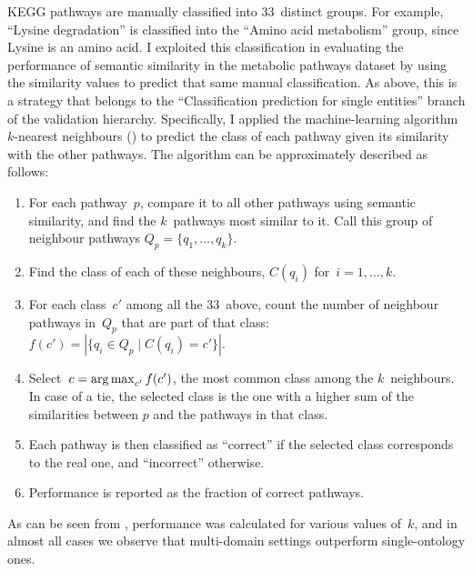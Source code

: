 KEGG pathways are manually classified into $33$~distinct groups. For example, ``Lysine degradation'' is classified into the ``Amino acid metabolism'' group, since Lysine is an amino acid. I exploited this classification in evaluating the performance of semantic similarity in the metabolic pathways dataset by using the similarity values to predict that same manual classification. As above, this is a strategy that belongs to the ``Classification prediction for single entities'' branch of the validation hierarchy. Specifically, I applied the machine-learning algorithm $k$-nearest neighbours (\knn) to predict the class of each pathway given its similarity with the other pathways. The algorithm can be approximately described as follows:
\begin{enumerate}
    \item For each pathway~$p$, compare it to all other pathways using semantic similarity, and find the $k$~pathways most similar to it. Call this group of neighbour pathways $Q_p = \{q_1, \dots, q_k\}$.
    \item Find the class of each of these neighbours, $C(q_i)$ for~$i=1,\ldots, k$.
    \item For each class~$c'$ among all the $33$~above, count the number of neighbour pathways in~$Q_p$ that are part of that class: $f(c') = |\{q_i \in Q_p \mid C(q_i) = c'\}|$.
    \item Select~$c = \operatorname*{arg\,max}_{c'}f(c')$, \ie the most common class among the $k$~neighbours. In case of a tie, the selected class is the one with a higher sum of the similarities between $p$ and the pathways in that class.
    \item Each pathway is then classified as ``correct'' if the selected class corresponds to the real one, and ``incorrect'' otherwise.
    \item Performance is reported as the fraction of correct pathways.
\end{enumerate}

As can be seen from , performance was calculated for various values of~$k$, and in almost all cases we observe that multi-domain settings outperform single-ontology ones.


